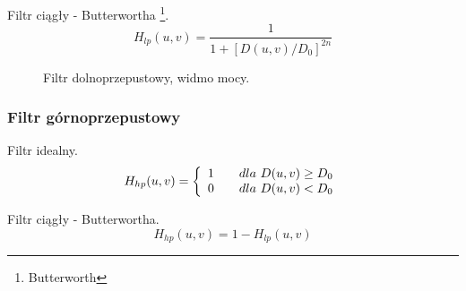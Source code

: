 \documentclass{classrep}
\begin{document}
Filtr ciągły - Butterwortha \footnote{Butterworth}.
\begin{equation}
H_{lp}(u,v) = \frac{1}{1+ \left[ D(u,v) / D_0\right] ^{2n} }
\end{equation}

 \begin{figure}[H]
  \centering
  \caption{Filtr dolnoprzepustowy, widmo mocy.}
  \label{fig_widmo_lena_lp}
\end{figure}

\subsubsection{Filtr górnoprzepustowy}

Filtr idealny.
\begin{equation}
  H_{hp}(u,v) = \left\{
  \begin{array}{l l}
    1 & \quad dla\ D(u,v) \geq D_0 \\
    0 & \quad dla\ D(u,v) < D_0 \\
  \end{array} \right.
\end{equation}

Filtr ciągły - Butterwortha.
\begin{equation}
H_{hp}(u,v) = 1 - H_{lp}(u,v)
\end{equation}
\end{document}
